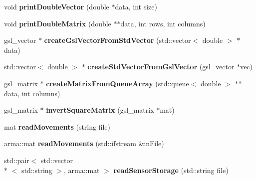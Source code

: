 \begin{DoxyCompactItemize}
\item 
\hypertarget{namespacekukadu_afceb599567dbb0584930fa93bb15c1b3}{void {\bfseries print\-Double\-Vector} (double $\ast$data, int size)}\label{namespacekukadu_afceb599567dbb0584930fa93bb15c1b3}

\item 
\hypertarget{namespacekukadu_a381c3ceb132b6c994ca9f588a1f9d346}{void {\bfseries print\-Double\-Matrix} (double $\ast$$\ast$data, int rows, int columns)}\label{namespacekukadu_a381c3ceb132b6c994ca9f588a1f9d346}

\item 
\hypertarget{namespacekukadu_a3166b4ad3fa7342f892e90b01ea725ff}{gsl\-\_\-vector $\ast$ {\bfseries create\-Gsl\-Vector\-From\-Std\-Vector} (std\-::vector$<$ double $>$ $\ast$data)}\label{namespacekukadu_a3166b4ad3fa7342f892e90b01ea725ff}

\item 
\hypertarget{namespacekukadu_a7e023bd38f66ef8b53bdbf70558d3053}{std\-::vector$<$ double $>$ $\ast$ {\bfseries create\-Std\-Vector\-From\-Gsl\-Vector} (gsl\-\_\-vector $\ast$vec)}\label{namespacekukadu_a7e023bd38f66ef8b53bdbf70558d3053}

\item 
\hypertarget{namespacekukadu_a0349839959bc23cc4ac3aa4f4fa2bd8d}{gsl\-\_\-matrix $\ast$ {\bfseries create\-Matrix\-From\-Queue\-Array} (std\-::queue$<$ double $>$ $\ast$$\ast$data, int columns)}\label{namespacekukadu_a0349839959bc23cc4ac3aa4f4fa2bd8d}

\item 
\hypertarget{namespacekukadu_a26d727537843251062a70a7a4ec9939d}{gsl\-\_\-matrix $\ast$ {\bfseries invert\-Square\-Matrix} (gsl\-\_\-matrix $\ast$mat)}\label{namespacekukadu_a26d727537843251062a70a7a4ec9939d}

\item 
\hypertarget{namespacekukadu_a9053e606ebc51864872868167de10d72}{mat {\bfseries read\-Movements} (string file)}\label{namespacekukadu_a9053e606ebc51864872868167de10d72}

\item 
\hypertarget{namespacekukadu_afb5618752910f4be56f93f778e323db9}{arma\-::mat {\bfseries read\-Movements} (std\-::ifstream \&in\-File)}\label{namespacekukadu_afb5618752910f4be56f93f778e323db9}

\item 
\hypertarget{namespacekukadu_af705f555ddead7ff7b1bb9dd937adff1}{std\-::pair$<$ std\-::vector\\*
$<$ std\-::string $>$, arma\-::mat $>$ {\bfseries read\-Sensor\-Storage} (std\-::string file)}\label{namespacekukadu_af705f555ddead7ff7b1bb9dd937adff1}


\end{DoxyCompactItemize}
